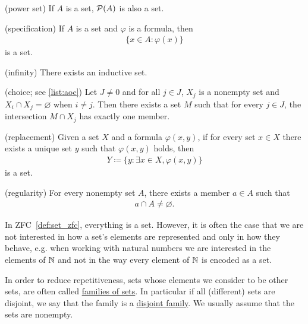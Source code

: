 \begin{definition}
\begin{description}
    (power set) If $A$ is a set, $\operatorname{\mathcal P}(A)$ is also a set.

    (specification) If $A$ is a set and $\varphi$ is a formula, then
    \begin{align*}
      \{ x \in A \colon \varphi(x) \}
    \end{align*}
    is a set.

    (infinity) There exists an inductive set.

    (choice; see \cref{list:aoc}) Let $J \neq 0$ and for all $j \in J$, $X_j$ is a nonempty set and $X_i \cap X_j = \varnothing$ when $i \neq j$. Then there exists a set $M$ such that for every $j \in J$, the intersection $M \cap X_j$ has exactly one member.

    (replacement) Given a set $X$ and a formula $\varphi(x, y)$, if for every set $x \in X$ there exists a unique set $y$ such that $\varphi(x, y)$ holds, then
    \begin{align*}
      Y \coloneqq \{ y \colon \exists x \in X, \varphi(x, y) \}
    \end{align*}
    is a set.

    (regularity) For every nonempty set $A$, there exists a member $a \in A$ such that
    \begin{align*}
      a \cap A \neq \varnothing.
    \end{align*}
  \end{description}
\end{definition}

\begin{note}\label{note:family_of_sets}
  In ZFC~\cref{def:set_zfc}, everything is a set. However, it is often the case that we are not interested in how a set's elements are represented and only in how they behave, e.g. when working with natural numbers we are interested in the elements of $\mathbb N$ and not in the way every element of $\mathbb N$ is encoded as a set.

  In order to reduce repetitiveness, sets whose elements we consider to be other sets, are often called \ul{families of sets}. In particular if all (different) sets are disjoint, we say that the family is a \ul{disjoint family}. We usually assume that the sets are nonempty.
\end{note}

